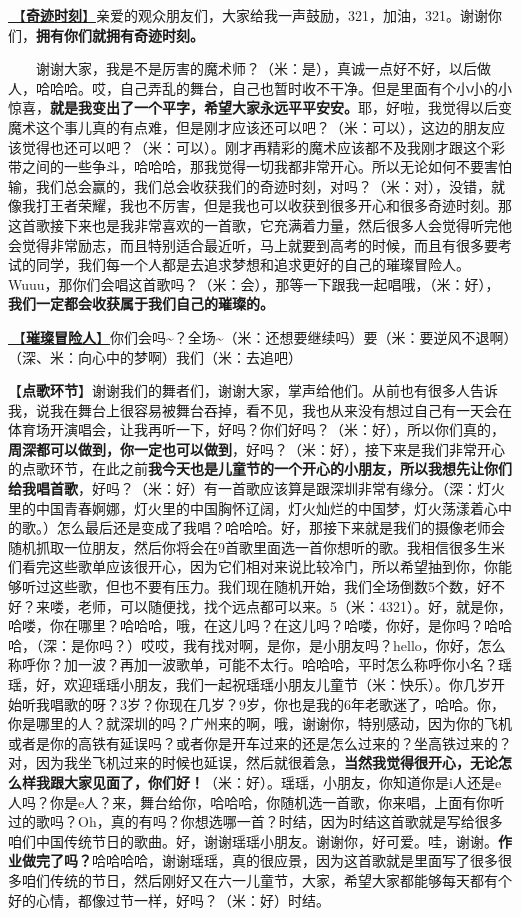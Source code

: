 \documentclass[]{ctexbook}
\begin{document}
\hyperref[magic-moment]{🎵【\textbf{奇迹时刻}】}亲爱的观众朋友们，大家给我一声鼓励，321，加油，321。谢谢你们，\textbf{拥有你们就拥有奇迹时刻。}

  谢谢大家，我是不是厉害的魔术师？（米：是），真诚一点好不好，以后做人，哈哈哈。哎，自己弄乱的舞台，自己也暂时收不干净。但是里面有个小小的小惊喜，\textbf{就是我变出了一个平字，希望大家永远平平安安。}耶，好啦，我觉得以后变魔术这个事儿真的有点难，但是刚才应该还可以吧？（米：可以），这边的朋友应该觉得也还可以吧？（米：可以）。刚才再精彩的魔术应该都不及我刚才跟这个彩带之间的一些争斗，哈哈哈，那我觉得一切我都非常开心。所以无论如何不要害怕输，我们总会赢的，我们总会收获我们的奇迹时刻，对吗？（米：对），没错，就像我打王者荣耀，我也不厉害，但是我也可以收获到很多开心和很多奇迹时刻。那这首歌接下来也是我非常喜欢的一首歌，它充满着力量，然后很多人会觉得听完他会觉得非常励志，而且特别适合最近听，马上就要到高考的时候，而且有很多要考试的同学，我们每一个人都是去追求梦想和追求更好的自己的璀璨冒险人。Wuuu，那你们会唱这首歌吗？（米：会），那等一下跟我一起唱哦，（米：好），\textbf{我们一定都会收获属于我们自己的璀璨的。}

\hyperref[adventurers]{🎵【\textbf{璀璨冒险人}】}你们会吗\textasciitilde？全场\textasciitilde（米：还想要继续吗）要（米：要逆风不退啊）（深、米：向心中的梦啊）我们（米：去追吧）

【\textbf{点歌环节}】谢谢我们的舞者们，谢谢大家，掌声给他们。从前也有很多人告诉我，说我在舞台上很容易被舞台吞掉，看不见，我也从来没有想过自己有一天会在体育场开演唱会，让我再听一下，好吗？你们好吗？（米：好），所以你们真的，\textbf{周深都可以做到，你一定也可以做到}，好吗？（米：好），接下来是我们非常开心的点歌环节，在此之前\textbf{我今天也是儿童节的一个开心的小朋友，所以我想先让你们给我唱首歌}，好吗？（米：好）有一首歌应该算是跟深圳非常有缘分。（深：灯火里的中国青春婀娜，灯火里的中国胸怀辽阔，灯火灿烂的中国梦，灯火荡漾着心中的歌。）怎么最后还是变成了我唱？哈哈哈。好，那接下来就是我们的摄像老师会随机抓取一位朋友，然后你将会在9首歌里面选一首你想听的歌。我相信很多生米们看完这些歌单应该很开心，因为它们相对来说比较冷门，所以希望抽到你，你能够听过这些歌，但也不要有压力。我们现在随机开始，我们全场倒数5个数，好不好？来喽，老师，可以随便找，找个远点都可以来。5（米：4321）。好，就是你，哈喽，你在哪里？哈哈哈，哦，在这儿吗？在这儿吗？哈喽，你好，是你吗？哈哈哈，（深：是你吗？）哎哎，我有找对啊，是你，是小朋友吗？hello，你好，怎么称呼你？加一波？再加一波歌单，可能不太行。哈哈哈，平时怎么称呼你小名？瑶瑶，好，欢迎瑶瑶小朋友，我们一起祝瑶瑶小朋友儿童节（米：快乐）。你几岁开始听我唱歌的呀？3岁？你现在几岁？9岁，你也是我的6年老歌迷了，哈哈。你，你是哪里的人？就深圳的吗？广州来的啊，哦，谢谢你，特别感动，因为你的飞机或者是你的高铁有延误吗？或者你是开车过来的还是怎么过来的？坐高铁过来的？对，因为我坐飞机过来的时候也延误，然后就很着急，\textbf{当然我觉得很开心，无论怎么样我跟大家见面了，你们好！}（米：好）。瑶瑶，小朋友，你知道你是i人还是e人吗？你是e人？来，舞台给你，哈哈哈，你随机选一首歌，你来唱，上面有你听过的歌吗？Oh，真的有吗？你想选哪一首？时结，因为时结这首歌就是写给很多咱们中国传统节日的歌曲。好，谢谢瑶瑶小朋友。谢谢你，好可爱。哇，谢谢。\textbf{作业做完了吗？}哈哈哈哈，谢谢瑶瑶，真的很应景，因为这首歌就是里面写了很多很多咱们传统的节日，然后刚好又在六一儿童节，大家，希望大家都能够每天都有个好的心情，都像过节一样，好吗？（米：好）时结。
\end{document}
